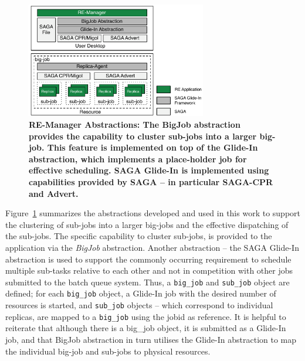 \documentclass{rspublic}
\newcommand{\jhanote}[1]{ {\textcolor{red} { ***SJ: #1 }}}
\newcommand{\jhanote}[1]{}
\begin{document}
\begin{figure}[t]
      \centering
      \includegraphics[width=0.7\textwidth]{remdmanager_v12}   
      \caption{\footnotesize \bf RE-Manager Abstractions: The BigJob
        abstraction provides the capability to cluster sub-jobs into a
        larger big-job. This feature is implemented on top of the
        Glide-In abstraction, which %
        implements a place-holder job for effective scheduling.  SAGA
        Glide-In is implemented using capabilities provided by SAGA --
        in particular SAGA-CPR and Advert.}
      \label{fig:abstractions}
\end{figure}

Figure~\ref{fig:abstractions} summarizes the abstractions developed
and used in this work to support the clustering of sub-jobs into a
larger big-jobs and the effective dispatching of the sub-jobs.  The
specific capability to cluster sub-jobs, is provided to the
application via the \emph{BigJob} abstraction. 
Another abstraction
-- the SAGA Glide-In abstraction is used to support the commonly
occurring requirement to schedule multiple sub-tasks relative to each
other and not in competition with other jobs submitted to the batch
queue system.  Thus, a \texttt{big\_job} and \texttt{sub\_job} object
are defined; for each \texttt{big\_job} object, a Glide-In job with
the desired number of resources is started, and \texttt{sub\_job}
objects -- which correspond to individual replicas, are mapped to a
\texttt{big\_job} using the jobid as reference. It is helpful to
reiterate that although there is a big\_job object, it is submitted
as a Glide-In job, and that BigJob abstraction in turn utilises the
Glide-In abstraction to map the individual big-job and sub-jobs to
physical resources.
\end{document}
